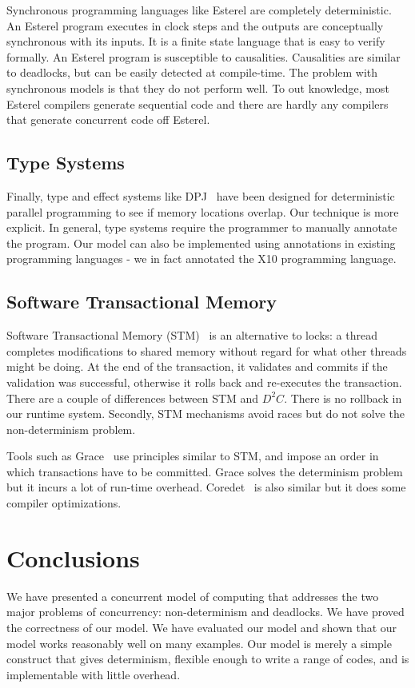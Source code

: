 \documentclass[10pt, conference, compsocconf]{IEEEtran}
\begin{document}
Synchronous programming languages like Esterel are completely deterministic. An Esterel program 
executes in clock steps and the outputs are conceptually synchronous with its inputs. 
It is a finite state language that is easy to verify formally. An Esterel program is susceptible 
to causalities. Causalities are similar to deadlocks, but can be easily detected at compile-time. 
The problem with synchronous models is that they do not perform well. To out knowledge, 
most Esterel compilers generate sequential code and there are hardly any compilers that generate 
concurrent code off Esterel. 
 
\subsection{Type Systems} 
 
Finally, type and effect systems like DPJ~\cite{bocchino2009type} 
 have been designed for deterministic parallel programming to see if
memory locations overlap. Our technique is more explicit. 
In general, type systems require the programmer to manually annotate the program. Our model can also be implemented using annotations in existing
programming languages - we in fact annotated the X10 programming language.
 
\subsection{Software Transactional Memory} 
Software Transactional Memory (STM)~\cite{shavit1995software} 
  is an alternative to locks: a thread completes modifications to  
shared memory without regard for what other threads might be doing. At the end of the transaction, 
it validates and commits if the validation was successful, otherwise it rolls back and re-executes 
the transaction. There are a couple of differences between STM and $D^2C$.
There is no rollback in our runtime system. Secondly,
 STM mechanisms avoid races but do not solve the non-determinism problem. 
 
Tools such as Grace~\cite{berger2009grace} use principles similar to STM, and impose 
an order in which transactions have to be committed. Grace solves the determinism problem 
but it incurs a lot of run-time overhead. Coredet~\cite{bergan2010coredet} is also similar but it does some compiler optimizations. 




\section{Conclusions}
\label{sec:conclusions}
We have presented a concurrent model of computing that addresses the
two major problems of concurrency: non-determinism and deadlocks.
We have proved the correctness of our model. We have evaluated
our model and shown that our model works reasonably well on many
examples.
Our model is merely a simple construct that gives determinism,
flexible enough to write a range of codes, and is implementable with little overhead.
\end{document}
